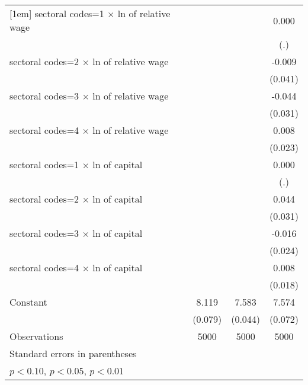 \begin{table}[htbp]
\begin{tabular}{l*{3}{c}}
[1em]
sectoral codes=1 $\times$ ln of relative wage&                     &                     &       0.000         \\
                    &                     &                     &         (.)         \\
[1em]
sectoral codes=2 $\times$ ln of relative wage&                     &                     &      -0.009         \\
                    &                     &                     &     (0.041)         \\
[1em]
sectoral codes=3 $\times$ ln of relative wage&                     &                     &      -0.044         \\
                    &                     &                     &     (0.031)         \\
[1em]
sectoral codes=4 $\times$ ln of relative wage&                     &                     &       0.008         \\
                    &                     &                     &     (0.023)         \\
[1em]
sectoral codes=1 $\times$ ln of capital&                     &                     &       0.000         \\
                    &                     &                     &         (.)         \\
[1em]
sectoral codes=2 $\times$ ln of capital&                     &                     &       0.044         \\
                    &                     &                     &     (0.031)         \\
[1em]
sectoral codes=3 $\times$ ln of capital&                     &                     &      -0.016         \\
                    &                     &                     &     (0.024)         \\
[1em]
sectoral codes=4 $\times$ ln of capital&                     &                     &       0.008         \\
                    &                     &                     &     (0.018)         \\
[1em]
Constant            &       8.119\sym{***}&       7.583\sym{***}&       7.574\sym{***}\\
                    &     (0.079)         &     (0.044)         &     (0.072)         \\
\hline
Observations        &        5000         &        5000         &        5000         \\
\hline\hline
\multicolumn{4}{l}{\footnotesize Standard errors in parentheses}\\
\multicolumn{4}{l}{\footnotesize \sym{*} \(p<0.10\), \sym{**} \(p<0.05\), \sym{***} \(p<0.01\)}\\
\end{tabular}
\end{table}
